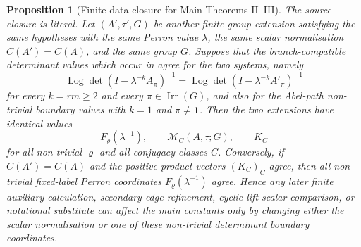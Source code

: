 \documentclass[11pt,a4paper]{amsart}
\theoremstyle{plain}
\newtheorem{proposition}[theorem]{Proposition}
\theoremstyle{definition}
\theoremstyle{remark}
\DeclareMathOperator{\Irr}{Irr}
\DeclareMathOperator{\Log}{Log}
\begin{document}
\begin{proposition}[Finite-data closure for Main Theorems II--III]
  The source closure is literal.  Let \((A',\tau',G)\) be another finite-group
  extension satisfying the same hypotheses with the same Perron value
  \(\lambda\), the same scalar normalisation \(C(A')=C(A)\), and the same
  group \(G\).  Suppose that the branch-compatible determinant values which
  occur in
   agree for the two systems,
  namely
  \[
    \Log\det(I-\lambda^{-k}A_\pi)^{-1}
    =
    \Log\det(I-\lambda^{-k}A'_\pi)^{-1}
  \]
  for every \(k=rm\ge2\) and every \(\pi\in\Irr(G)\), and also for the
  Abel-path non-trivial boundary values with \(k=1\) and
  \(\pi\ne\mathbf1\).  Then the two extensions have identical values
  \[
    F_\varrho(\lambda^{-1}),\qquad
    \mathcal M_C(A,\tau;G),
    \qquad K_C
  \]
  for all non-trivial \(\varrho\) and all conjugacy classes \(C\).  Conversely,
  if \(C(A')=C(A)\) and the positive product vectors \((K_C)_C\) agree, then
  all non-trivial fixed-label Perron coordinates
  \(F_\varrho(\lambda^{-1})\) agree.  Hence any later finite auxiliary
  calculation, secondary-edge refinement, cyclic-lift scalar comparison, or
  notational substitute can affect the main constants only by changing either the scalar
  normalisation or one of these non-trivial determinant boundary coordinates.
\end{proposition}
\end{document}
